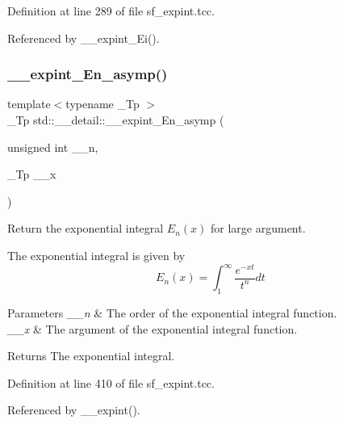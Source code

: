 Definition at line 289 of file sf\+\_\+expint.\+tcc.



Referenced by \+\_\+\+\_\+expint\+\_\+\+Ei().

\mbox{\label{namespacestd_1_1____detail_a3b9f1cc6d66cbd705f52c520eb96b467}} 
\subsubsection{\texorpdfstring{\+\_\+\+\_\+expint\+\_\+\+En\+\_\+asymp()}{\_\_expint\_En\_asymp()}}
{\footnotesize\ttfamily template$<$typename \+\_\+\+Tp $>$ \\
\+\_\+\+Tp std\+::\+\_\+\+\_\+detail\+::\+\_\+\+\_\+expint\+\_\+\+En\+\_\+asymp (\begin{DoxyParamCaption}\item[{unsigned int}]{\+\_\+\+\_\+n,  }\item[{\+\_\+\+Tp}]{\+\_\+\+\_\+x }\end{DoxyParamCaption})}



Return the exponential integral $ E_n(x) $ for large argument. 

The exponential integral is given by \[ E_n(x) = \int_{1}^\infty \frac{e^{-xt}}{t^n} dt \]


\begin{DoxyParams}{Parameters}
{\em \+\_\+\+\_\+n} & The order of the exponential integral function. \\
\hline
{\em \+\_\+\+\_\+x} & The argument of the exponential integral function. \\
\hline
\end{DoxyParams}
\begin{DoxyReturn}{Returns}
The exponential integral. 
\end{DoxyReturn}


Definition at line 410 of file sf\+\_\+expint.\+tcc.



Referenced by \+\_\+\+\_\+expint().

\mbox{\label{namespacestd_1_1____detail_a34e1eb1248cdad9ceed2aa33732de6ea}} 
